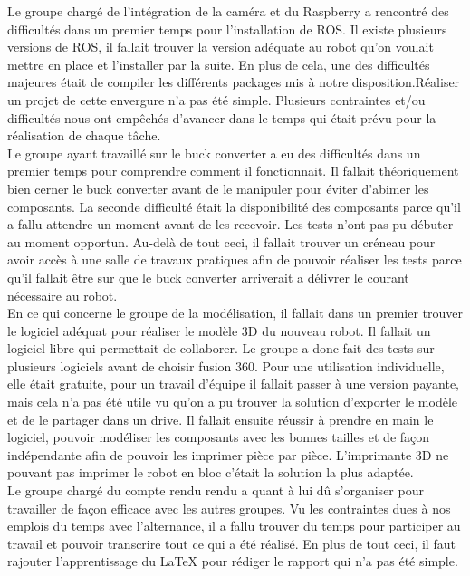\documentclass{PackagerQualityN}
\begin{document}
Le groupe chargé de l'intégration de la caméra et du Raspberry a rencontré des difficultés dans un premier temps pour l'installation de ROS. Il existe plusieurs versions de ROS, il fallait trouver la version adéquate au robot qu'on voulait mettre en place et l'installer par la suite.
En plus de cela, une des difficultés majeures était de compiler les différents packages mis à notre disposition.Réaliser un projet de cette envergure n’a pas été simple. Plusieurs contraintes et/ou difficultés nous ont empêchés d’avancer dans le temps qui était prévu pour la réalisation de chaque tâche.\\

Le groupe ayant travaillé sur le buck converter a eu des difficultés dans un premier temps pour comprendre comment il fonctionnait. Il fallait théoriquement bien cerner le buck converter avant de le manipuler pour éviter d’abimer les composants. 
La seconde difficulté était la disponibilité des composants parce qu’il a fallu attendre un moment avant de les recevoir. Les tests n’ont pas pu débuter au moment opportun.
Au-delà de tout ceci, il fallait trouver un créneau pour avoir accès à une salle de travaux pratiques afin de pouvoir réaliser les tests parce qu’il fallait être sur que le buck converter arriverait a délivrer le courant nécessaire au robot.\\

En ce qui concerne le groupe de la modélisation, il fallait dans un premier trouver le logiciel adéquat pour réaliser le modèle 3D du nouveau robot. Il fallait un logiciel libre qui permettait de collaborer. Le groupe a donc fait des tests sur plusieurs logiciels avant de choisir fusion 360. Pour une utilisation individuelle, elle était gratuite, pour un travail d'équipe il fallait passer à une version payante, mais cela n'a pas été utile vu qu'on a pu trouver la solution d'exporter le modèle et de le partager dans un drive.
Il fallait ensuite réussir à prendre en main le logiciel, pouvoir modéliser les composants avec les bonnes tailles et de façon indépendante afin de pouvoir les imprimer pièce par pièce. L'imprimante 3D ne pouvant pas imprimer le robot en bloc c'était la solution la plus adaptée.\\

Le groupe chargé du compte rendu rendu a quant à lui dû s'organiser pour travailler de façon efficace avec les autres groupes. Vu les contraintes dues à nos emplois du temps avec l'alternance, il a fallu trouver du temps pour participer au travail et pouvoir transcrire tout ce qui a été réalisé. En plus de tout ceci, il faut rajouter l'apprentissage du LaTeX pour rédiger le rapport qui n'a pas été simple.\\
\end{document}
